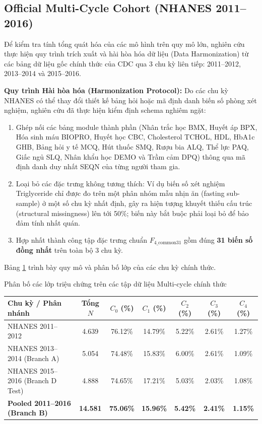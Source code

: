 \subsection{Official Multi-Cycle Cohort (NHANES 2011--2016)}
Để kiểm tra tính tổng quát hóa của các mô hình trên quy mô lớn, nghiên cứu thực hiện quy trình trích xuất và hài hòa hóa dữ liệu (Data Harmonization) từ các bảng dữ liệu gốc chính thức của CDC qua 3 chu kỳ liên tiếp: 2011--2012, 2013--2014 và 2015--2016.

\textbf{Quy trình Hài hòa hóa (Harmonization Protocol):}
Do các chu kỳ NHANES có thể thay đổi thiết kế bảng hỏi hoặc mã định danh biến số phòng xét nghiệm, nghiên cứu đã thực hiện kiểm định schema nghiêm ngặt:
\begin{enumerate}
    \item Ghép nối các bảng module thành phần (Nhân trắc học BMX, Huyết áp BPX, Hóa sinh máu BIOPRO, Huyết học CBC, Cholesterol TCHOL, HDL, HbA1c GHB, Bảng hỏi y tế MCQ, Hút thuốc SMQ, Rượu bia ALQ, Thể lực PAQ, Giấc ngủ SLQ, Nhân khẩu học DEMO và Trầm cảm DPQ) thông qua mã định danh duy nhất SEQN của từng người tham gia.
    \item Loại bỏ các đặc trưng không tương thích: Ví dụ biến số xét nghiệm Triglyceride chỉ được đo trên một phân nhóm mẫu nhịn ăn (fasting sub-sample) ở một số chu kỳ nhất định, gây ra hiện tượng khuyết thiếu cấu trúc (structural missingness) lên tới 50\%; biến này bắt buộc phải loại bỏ để bảo đảm tính nhất quán.
    \item Hợp nhất thành công tập đặc trưng chuẩn $F_{4\_\text{common31}}$ gồm đúng \textbf{31 biến số đồng nhất} trên toàn bộ 3 chu kỳ.
\end{enumerate}

Bảng \ref{tab:multicycle-class-dist} trình bày quy mô và phân bố lớp của các chu kỳ chính thức.

\begin{table}{Phân bố các lớp triệu chứng trên các tập dữ liệu Multi-cycle chính thức}
\centering
\label{tab:multicycle-class-dist}
\begin{tabular}{l c c c c c c}
\toprule
\textbf{Chu kỳ / Phân nhánh} & \textbf{Tổng $N$} & \textbf{$C_0$ (\%)} & \textbf{$C_1$ (\%)} & \textbf{$C_2$ (\%)} & \textbf{$C_3$ (\%)} & \textbf{$C_4$ (\%)} \\
\midrule
NHANES 2011--2012 & 4.639 & 76.12\% & 14.79\% & 5.22\% & 2.61\% & 1.27\% \\
NHANES 2013--2014 (Branch A) & 5.054 & 74.48\% & 15.83\% & 6.00\% & 2.61\% & 1.09\% \\
NHANES 2015--2016 (Branch D Test) & 4.888 & 74.65\% & 17.21\% & 5.03\% & 2.03\% & 1.08\% \\
\midrule
\textbf{Pooled 2011--2016 (Branch B)} & \textbf{14.581} & \textbf{75.06\%} & \textbf{15.96\%} & \textbf{5.42\%} & \textbf{2.41\%} & \textbf{1.15\%} \\
\bottomrule
\end{tabular}
\end{table}


